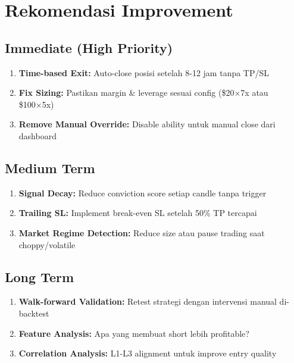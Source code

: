 \documentclass[
  11pt,
  a4paper,
]{article}
\providecommand{\tightlist}{%
  \setlength{\itemsep}{0pt}\setlength{\parskip}{0pt}}
\begin{document}
\section{Rekomendasi Improvement}\label{rekomendasi-improvement}

\subsection{Immediate (High Priority)}\label{immediate-high-priority}

\begin{enumerate}
\def\labelenumi{\arabic{enumi}.}
\tightlist
\item
  \textbf{Time-based Exit:} Auto-close posisi setelah 8-12 jam tanpa
  TP/SL
\item
  \textbf{Fix Sizing:} Pastikan margin \& leverage sesuai config
  (\$20×7x atau \$100×5x)
\item
  \textbf{Remove Manual Override:} Disable ability untuk manual close
  dari dashboard
\end{enumerate}

\subsection{Medium Term}\label{medium-term}

\begin{enumerate}
\def\labelenumi{\arabic{enumi}.}
\tightlist
\item
  \textbf{Signal Decay:} Reduce conviction score setiap candle tanpa
  trigger
\item
  \textbf{Trailing SL:} Implement break-even SL setelah 50\% TP tercapai
\item
  \textbf{Market Regime Detection:} Reduce size atau pause trading saat
  choppy/volatile
\end{enumerate}

\subsection{Long Term}\label{long-term}

\begin{enumerate}
\def\labelenumi{\arabic{enumi}.}
\tightlist
\item
  \textbf{Walk-forward Validation:} Retest strategi dengan intervensi
  manual di-backtest
\item
  \textbf{Feature Analysis:} Apa yang membuat short lebih profitable?
\item
  \textbf{Correlation Analysis:} L1-L3 alignment untuk improve entry
  quality
\end{enumerate}
\end{document}
